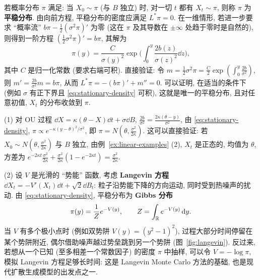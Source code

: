 若概率分布 $\pi$ 满足: 当 $X_0\sim\pi$ (与 $B$ 独立) 时, 对一切 $t$ 都有 $X_t\sim\pi$, 则称 $\pi$ 为\textbf{平稳分布}. 由向前方程, 平稳分布的密度应满足 $L^*\pi=0$. 在一维情形, 若进一步要求 ``概率流'' $b\pi-\frac{1}{2}(\sigma^2\pi)'$ 为零 (这在 $\pi$ 及其导数在 $\pm\infty$ 处趋于零时是自然的), 则得到一阶方程 $(\frac{1}{2}\sigma^2\pi)'=b\pi$, 其解为
\begin{equation}\label{eq:stationary-density}
\pi(y)=\frac{C}{\sigma(y)^2}\exp\Big(\int_0^y\frac{2b(z)}{\sigma(z)^2}\dd z\Big),
\end{equation}
其中 $C$ 是归一化常数 (要求右端可积). 直接验证: 令 $m=\frac{1}{2}\sigma^2\pi=\frac{C}{2}\exp(\int_0^y\frac{2b}{\sigma^2})$, 则 $m'=\frac{2b}{\sigma^2}m=b\pi$, 从而 $L^*\pi=-(b\pi)'+m''=0$. 可以证明, 在适当的条件下 (例如 $\sigma$ 有正下界且 \eqref{eq:stationary-density} 可积), 这就是唯一的平稳分布, 且对任意初值, $X_t$ 的分布收敛到 $\pi$.

\begin{example}\label{ex:stationary}
(1) 对 OU 过程 $\dd X=\kappa(\theta-X)\dd t+\sigma\dd B$, $\frac{2b}{\sigma^2}=\frac{2\kappa(\theta-y)}{\sigma^2}$, 由 \eqref{eq:stationary-density}, $\pi\propto e^{-\kappa(y-\theta)^2/\sigma^2}$, 即 $\pi=N(\theta,\frac{\sigma^2}{2\kappa})$. 这可以直接验证: 若 $X_0\sim N(\theta,\frac{\sigma^2}{2\kappa})$ 与 $B$ 独立, 由例~\ref{ex:linear-examples} (2), $X_t$ 是正态的, 均值为 $\theta$, 方差为 $e^{-2\kappa t}\frac{\sigma^2}{2\kappa}+\frac{\sigma^2}{2\kappa}(1-e^{-2\kappa t})=\frac{\sigma^2}{2\kappa}$.

(2) 设 $V$ 是光滑的 ``势能'' 函数, 考虑 \textbf{Langevin 方程} $\dd X_t=-V'(X_t)\dd t+\sqrt{2}\dd B_t$: 粒子沿势能下降的方向运动, 同时受到热噪声的扰动. 由 \eqref{eq:stationary-density}, 平稳分布为 \textbf{Gibbs 分布}
\[
\pi(y)=\frac{1}{Z}e^{-V(y)},\qquad Z=\int_{\mathbb{R}}e^{-V(y)}\mathop{}\!\mathrm{d} y.
\]
当 $V$ 有多个极小点时 (例如双势阱 $V(y)=(y^2-1)^2$), 过程大部分时间停留在某个势阱附近, 偶尔借助噪声越过势垒跳到另一个势阱 (图~\ref{fig:langevin}). 反过来, 若想从一个已知 (至多相差一个常数因子) 的密度 $\pi$ 中抽样, 可以令 $V=-\log\pi$, 模拟 Langevin 方程足够长时间: 这是 Langevin Monte Carlo 方法的基础, 也是现代扩散生成模型的出发点之一.
\end{example}

